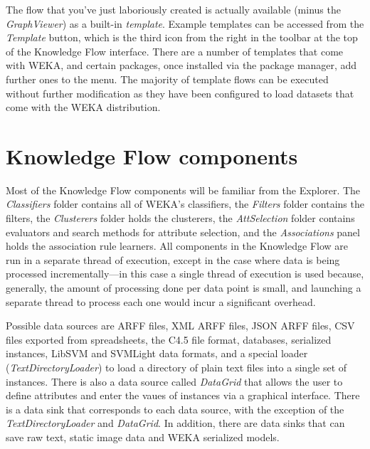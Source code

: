 The flow that you've just laboriously created is actually available
(minus the \textit{GraphViewer}) as a
built-in \textit{template}. Example templates can be accessed from the
\textit{Template} button, which is the third icon from the right in the toolbar
at the top of the Knowledge Flow interface. There are a number of
templates that come with WEKA, and certain packages, once installed
via the package manager, add further ones to the menu. The majority of
template flows can be executed without further modification as they
have been configured to load datasets that come with the WEKA
distribution.

\section{Knowledge Flow components}

Most of the Knowledge Flow components will be familiar from the
Explorer. The \textit{Classifiers} folder contains all of WEKA's
classifiers, the \textit{Filters} folder contains the filters,
the \textit{Clusterers} folder holds the clusterers,
the \textit{AttSelection} folder contains evaluators and search
methods for attribute selection, and the \textit{Associations} panel
holds the association rule learners. All components in the Knowledge
Flow are run in a separate thread of execution, except in the case
where data is being processed incrementally---in this case a single
thread of execution is used because, generally, the amount of
processing done per data point is small, and launching a separate
thread to process each one would incur a significant overhead.

Possible data sources are ARFF files, XML ARFF files, JSON ARFF files,
CSV files exported from spreadsheets, the C4.5 file format, databases,
serialized instances, LibSVM and SVMLight data formats, and a special
loader (\textit{TextDirectoryLoader}) to load a directory of plain
text files into a single set of instances. There is also a data source
called
\textit{DataGrid} that allows the user to define attributes and enter the vaues
of instances via a graphical interface. There is a data sink that
corresponds to each data source, with the exception of the
\textit{TextDirectoryLoader} and \textit{DataGrid}. In addition, there are data sinks
that can save raw text, static image data and WEKA serialized models.

